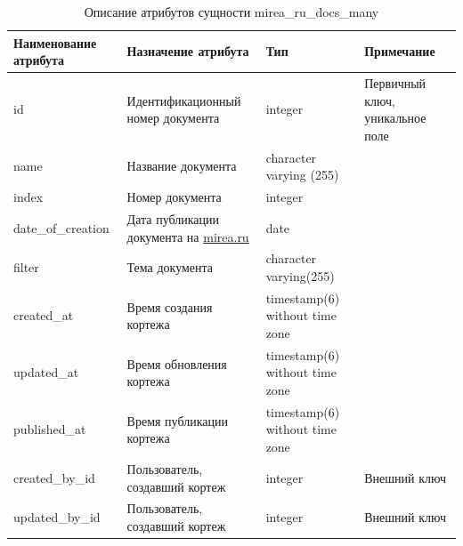 \documentclass{mirea}
\begin{document}
	\begin{longtable}{ |p{}|p{}|p{}|p{}| } 
		\caption{Описание атрибутов сущности mirea\_ru\_docs\_many}
		\endfirsthead
		\endhead
		\hline
		Наименование атрибута & Назначение атрибута & Тип & Примечание \\ \hline
		
		id & Идентификацион\-ный номер документа & integer & Первичный ключ, уникальное поле \\ \hline
		
		name & Название документа & character varying (255) & \\ \hline
		
		index & Номер документа & integer & \\ \hline
		
		date\_of\_creation & Дата публикации документа на \url{mirea.ru} & date & \\ \hline
		
		filter & Тема документа & character varying(255) & \\ \hline
		
		created\_at & Время создания кортежа & timestamp(6) without time zone & \\ \hline
		
		updated\_at & Время обновления кортежа & timestamp(6) without time zone & \\ \hline
		
		published\_at & Время публикации кортежа & timestamp(6) without time zone & \\ \hline
		
		created\_by\_id & Пользователь, создавший кортеж & integer & Внешний ключ \\ \hline
		
		updated\_by\_id & Пользователь, создавший кортеж & integer & Внешний ключ \\ \hline
		
	\end{longtable}
\end{document}
